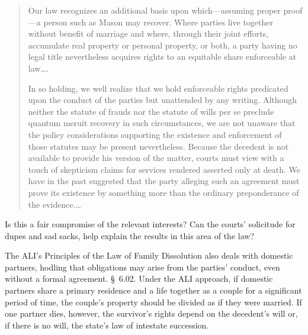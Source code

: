 \begin{quotation}
Our law recognizes an additional basis upon which---assuming proper proof---a
person such as Mason may recover. Where parties live together without
benefit of marriage and where, through their joint efforts, accumulate real
property or personal property, or both, a party having no legal title
nevertheless acquires rights to an equitable share enforceable at law\dots.

In so holding, we well realize that we hold enforceable rights predicated upon
the conduct of the parties but unattended by any writing. Although neither the
statute of frauds nor the statute of wills per se preclude quantum meruit
recovery in such circumstances, we are not unaware that the policy
considerations supporting the existence and enforcement of those statutes may
be present nevertheless. Because the decedent is not available to provide his
version of the matter, courts must view with a touch of skepticism claims for
services rendered asserted only at death. We have in the past suggested that
the party alleging such an agreement must prove its existence by something more
than the ordinary preponderance of the evidence.\dots
\end{quotation}

Is this a fair compromise of the relevant interests? Can
the courts' solicitude for dupes and sad
sacks, help explain the results in this area of the law?

\item
The ALI's Principles of the Law of Family Dissolution also deals with domestic
partners, hodling that obligations may arise from the parties' conduct, even
without a formal agreement. \S~6.02. Under the ALI approach, if domestic
partners share a primary residence and a life together as a couple for a
significant period of time, the couple's property should be divided as if they
were married. If one partner dies, however, the survivor's rights depend on the
decedent's will or, if there is no will, the state's law of intestate
succession.

